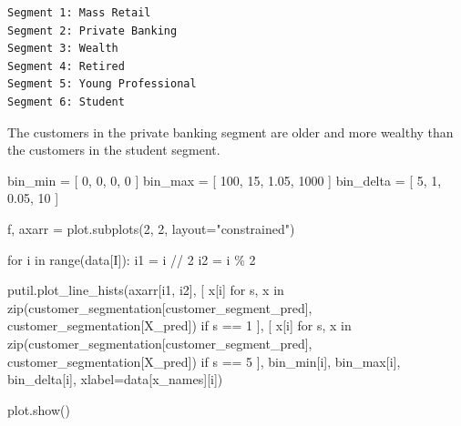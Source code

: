 \documentclass[
  letterpaper,
  DIV=11,
  numbers=noendperiod]{scrartcl}
\newenvironment{Shaded}{\begin{snugshade}}{\end{snugshade}}
\newcommand{\BuiltInTok}[1]{\textcolor[rgb]{0.00,0.23,0.31}{#1}}
\newcommand{\ControlFlowTok}[1]{\textcolor[rgb]{0.00,0.23,0.31}{#1}}
\newcommand{\DecValTok}[1]{\textcolor[rgb]{0.68,0.00,0.00}{#1}}
\newcommand{\FloatTok}[1]{\textcolor[rgb]{0.68,0.00,0.00}{#1}}
\newcommand{\KeywordTok}[1]{\textcolor[rgb]{0.00,0.23,0.31}{#1}}
\newcommand{\NormalTok}[1]{\textcolor[rgb]{0.00,0.23,0.31}{#1}}
\newcommand{\OperatorTok}[1]{\textcolor[rgb]{0.37,0.37,0.37}{#1}}
\newcommand{\StringTok}[1]{\textcolor[rgb]{0.13,0.47,0.30}{#1}}
\begin{document}
\begin{verbatim}
Segment 1: Mass Retail
Segment 2: Private Banking
Segment 3: Wealth
Segment 4: Retired
Segment 5: Young Professional
Segment 6: Student
\end{verbatim}

The customers in the private banking segment are older and more wealthy
than the customers in the student segment.

\begin{Shaded}
\begin{Highlighting}[]
\NormalTok{bin\_min }\OperatorTok{=}\NormalTok{ [ }\DecValTok{0}\NormalTok{, }\DecValTok{0}\NormalTok{, }\DecValTok{0}\NormalTok{, }\DecValTok{0}\NormalTok{ ]}
\NormalTok{bin\_max }\OperatorTok{=}\NormalTok{ [ }\DecValTok{100}\NormalTok{, }\DecValTok{15}\NormalTok{, }\FloatTok{1.05}\NormalTok{, }\DecValTok{1000}\NormalTok{ ]}
\NormalTok{bin\_delta }\OperatorTok{=}\NormalTok{ [ }\DecValTok{5}\NormalTok{, }\DecValTok{1}\NormalTok{, }\FloatTok{0.05}\NormalTok{, }\DecValTok{10}\NormalTok{ ]}

\NormalTok{f, axarr }\OperatorTok{=}\NormalTok{ plot.subplots(}\DecValTok{2}\NormalTok{, }\DecValTok{2}\NormalTok{, layout}\OperatorTok{=}\StringTok{"constrained"}\NormalTok{)}

\ControlFlowTok{for}\NormalTok{ i }\KeywordTok{in} \BuiltInTok{range}\NormalTok{(data[}\StringTok{\textquotesingle{}I\textquotesingle{}}\NormalTok{]):}
\NormalTok{  i1 }\OperatorTok{=}\NormalTok{ i }\OperatorTok{//} \DecValTok{2}
\NormalTok{  i2 }\OperatorTok{=}\NormalTok{ i }\OperatorTok{\%} \DecValTok{2}

\NormalTok{  putil.plot\_line\_hists(axarr[i1, i2],}
\NormalTok{                        [ x[i] }\ControlFlowTok{for}\NormalTok{ s, x }\KeywordTok{in}
                          \BuiltInTok{zip}\NormalTok{(customer\_segmentation[}\StringTok{\textquotesingle{}customer\_segment\_pred\textquotesingle{}}\NormalTok{],}
\NormalTok{                              customer\_segmentation[}\StringTok{\textquotesingle{}X\_pred\textquotesingle{}}\NormalTok{])}
                          \ControlFlowTok{if}\NormalTok{ s }\OperatorTok{==} \DecValTok{1}\NormalTok{ ],}
\NormalTok{                        [ x[i] }\ControlFlowTok{for}\NormalTok{ s, x }\KeywordTok{in}
                          \BuiltInTok{zip}\NormalTok{(customer\_segmentation[}\StringTok{\textquotesingle{}customer\_segment\_pred\textquotesingle{}}\NormalTok{],}
\NormalTok{                              customer\_segmentation[}\StringTok{\textquotesingle{}X\_pred\textquotesingle{}}\NormalTok{])}
                          \ControlFlowTok{if}\NormalTok{ s }\OperatorTok{==} \DecValTok{5}\NormalTok{ ],}
\NormalTok{                       bin\_min[i], bin\_max[i], bin\_delta[i],}
\NormalTok{                       xlabel}\OperatorTok{=}\NormalTok{data[}\StringTok{\textquotesingle{}x\_names\textquotesingle{}}\NormalTok{][i])}

\NormalTok{plot.show()}
\end{Highlighting}
\end{Shaded}
\end{document}
